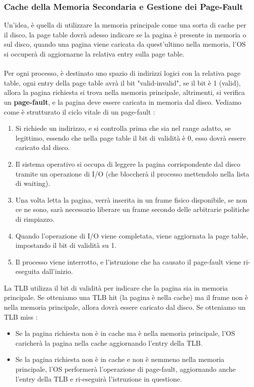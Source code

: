 \documentclass[12pt, letterpaper]{article}
\newcommand{\acc}{\\\hphantom{}\\}
\begin{document}
\subsubsection{Cache della Memoria Secondaria e Gestione dei Page-Fault}
Un'idea, è quella di utilizzare la memoria principale come una sorta di cache per il disco, la page table dovrà adesso 
indicare se la pagina è presente in memoria o sul disco, quando una pagina viene caricata da quest'ultimo nella memoria, 
l'OS si occuperà di aggiornarne la relativa entry sulla page table.\acc 
Per ogni processo, è destinato uno spazio di indirizzi logici con la relativa page table, ogni entry della page 
table avrà il bit "valid-invalid", se il bit è 1 (valid), allora la pagina richiesta si trova nella memoria principale,
altrimenti, si verifica un \textbf{page-fault}, e la pagina deve essere caricata in memoria dal disco. Vediamo come 
è strutturato il ciclo vitale di un page-fault :\begin{enumerate}
    \item Si richiede un indirizzo, e si controlla prima che sia nel range adatto, se legittimo, essendo che nella 
    page table il bit di validità è 0, esso dovrà essere caricato dal disco.
    \item Il sistema operativo si occupa di leggere la pagina corrispondente dal disco tramite un operazione di 
    I/O (che bloccherà il processo mettendolo nella lista di waiting). 
    \item Una volta letta la pagina, verrà inserita in un frame fisico disponibile, se non ce ne sono, sarà necessario 
    liberare un frame secondo delle arbitrarie politiche di rimpiazzo.
    \item Quando l'operazione di I/O viene completata, viene aggiornata la page table, impostando il bit di 
    validità su 1.
    \item Il processo viene interrotto, e l'istruzione che ha causato il page-fault viene ri-eseguita dall'inizio.
\end{enumerate}
La TLB utilizza il bit di validità per indicare che la pagina sia in memoria principale. Se otteniamo una TLB hit (la 
pagina è nella cache) ma il frame non è nella memoria principale, allora dovrà essere caricato dal disco.
Se otteniamo un TLB miss : \begin{itemize}
    \item Se la pagina richiesta non è in cache ma è nella memoria principale, l'OS caricherà la pagina 
    nella cache aggiornando l'entry della TLB.
    \item Se la pagina richiesta non è in cache e non è nemmeno nella memoria principale, l'OS performerà l'operazione 
    di page-fault, aggiornando anche l'entry della TLB e ri-eseguirà l'istruzione in questione.
\end{itemize}
\end{document}
